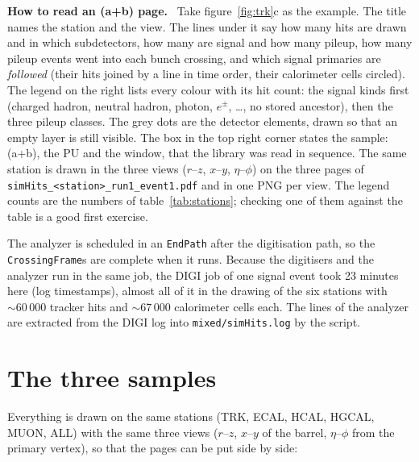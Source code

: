 \documentclass[11pt,a4paper]{article}
\newcommand{\code}[1]{\texttt{#1}}
\newenvironment{plainwords}[1][In plain words]{%
  \par\medskip\noindent\setlength{\fboxsep}{6pt}\setlength{\fboxrule}{0.6pt}%
  \begin{lrbox}{\plainbox}\begin{minipage}{\dimexpr\textwidth-2\fboxsep-2\fboxrule\relax}\small
  \textbf{\textcolor{plainrule}{#1.}}\ \ignorespaces}{%
  \end{minipage}\end{lrbox}\noindent\fcolorbox{plainrule}{plainbg}{\usebox{\plainbox}}\par\medskip}
\begin{document}
\begin{plainwords}[How to read an (a+b) page]
Take figure~\ref{fig:trk}c as the example. The title names the station and the view. The lines under it say
how many hits are drawn and in which subdetectors, how many are signal and how many pileup, how many pileup
events went into each bunch crossing, and which signal primaries are \emph{followed} (their hits joined by a
line in time order, their calorimeter cells circled). The legend on the right lists every colour with its hit
count: the signal kinds first (charged hadron, neutral hadron, photon, $e^\pm$, \ldots, no stored ancestor),
then the three pileup classes. The grey dots are the detector elements, drawn so that an empty layer is
still visible. The box in the top right corner states the sample: (a+b), the PU and the window, that the
library was read in sequence. The same station is drawn in the three views ($r$--$z$, $x$--$y$,
$\eta$--$\phi$) on the three pages of \code{simHits\_<station>\_run1\_event1.pdf} and in one PNG per view. The
legend counts are the numbers of table~\ref{tab:stations}; checking one of them against the table is a good
first exercise.
\end{plainwords}
The analyzer is scheduled in an \code{EndPath} after the digitisation path, so the \code{CrossingFrame}s
are complete when it runs. Because the digitisers and the analyzer run in the same job, the DIGI job of one
signal event took 23 minutes here (log timestamps), almost all of it in the drawing of the six stations with
$\sim 60\,000$ tracker hits and $\sim 67\,000$ calorimeter cells each. The lines of the analyzer are
extracted from the DIGI log into \code{mixed/simHits.log} by the script.

\section{The three samples}
\label{sec:samples}

Everything is drawn on the same stations (TRK, ECAL, HCAL, HGCAL, MUON, ALL) with the same three views
($r$--$z$, $x$--$y$ of the barrel, $\eta$--$\phi$ from the primary vertex), so that the pages can be put side
by side:
\end{document}
